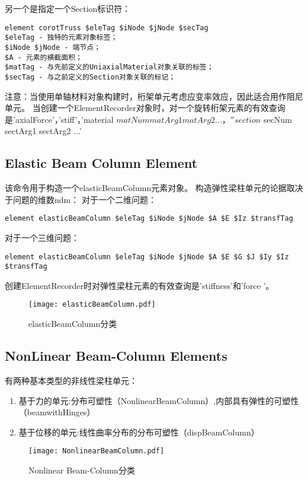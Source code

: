 \documentclass[lang=cn]{elegantpaper}
\begin{document}
另一个是指定一个Section标识符：
\begin{lstlisting}
element corotTruss $eleTag $iNode $jNode $secTag
$eleTag - 独特的元素对象标签；
$iNode $jNode - 端节点；
$A - 元素的横截面积；
$matTag - 与先前定义的UniaxialMaterial对象关联的标签；
$secTag - 与之前定义的Section对象关联的标记；
\end{lstlisting}



注意：当使用单轴材料对象构建时，桁架单元考虑应变率效应，因此适合用作阻尼单元。
当创建一个ElementRecorder对象时，对一个旋转桁架元素的有效查询是'axialForce'，'stiff'，'material $ matNum matArg1 matArg2 ...，''section $ secNum sectArg1 sectArg2 ...'
\subsection{Elastic Beam Column Element}
该命令用于构造一个elasticBeamColumn元素对象。 构造弹性梁柱单元的论据取决于问题的维数ndm：
对于一个二维问题：
\begin{lstlisting}
element elasticBeamColumn $eleTag $iNode $jNode $A $E $Iz $transfTag
\end{lstlisting}
对于一个三维问题：
\begin{lstlisting}
element elasticBeamColumn $eleTag $iNode $jNode $A $E $G $J $Iy $Iz $transfTag
\end{lstlisting}
创建ElementRecorder时对弹性梁柱元素的有效查询是'stiffness'和'force '。
\begin{figure}[H]		
	\centering
	\texttt{[image: elasticBeamColumn.pdf]}
	\caption{elasticBeamColumn分类}
	\label{tu9}
\end{figure}





\subsection{NonLinear Beam-Column Elements}
有两种基本类型的非线性梁柱单元：
\begin{enumerate}
	\item 基于力的单元:分布可塑性（NonlinearBeamColumn）,内部具有弹性的可塑性（beamwithHinges）
	\item 基于位移的单元:线性曲率分布的分布可塑性（dispBeamColumn）
\end{enumerate}
\begin{figure}[H]		
	\centering
	\texttt{[image: NonlinearBeamColumn.pdf]}
	\caption{Nonlinear Beam-Column分类}
	\label{tu10}
\end{figure}
\end{document}

